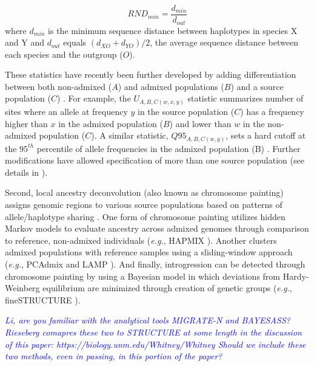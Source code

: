 \documentclass[11pt]{article}
\newcommand{\gmj}[1]{\textcolor{blue}{ \emph{\scriptsize  #1}} } %
\begin{document}
 
 \begin{equation}
 	RND_{min} = \frac{d_{min}}{d_{out}}
 \end{equation}
where $d_{min}$ is the minimum sequence distance between haplotypes in species X and Y and $d_{out}$ equals $(d_{XO} + d_{YO})/2$, the average sequence distance between each species and the outgroup ($O$).
 
These statistics have recently been further developed by adding differentiation between both non-admixed ($A$) and admixed populations ($B$) and a source population ($C$) \cite{racimo2016}. 
For example, the $U_{A,B,C(w,x,y)}$ statistic summarizes number of sites where an allele at frequency $y$ in the source population ($C$) has a frequency higher than $x$ in the admixed population ($B$) and lower than $w$ in the non-admixed population ($C$).
A similar statistic, $Q95_{A,B,C(w,y)}$, sets a hard cutoff at the $95^{th}$ percentile of allele frequencies in the admixed population (B) \cite{racimo2016}.
Further modifications have allowed specification of more than one source population (see details in \cite{racimo2016}).
 
Second, local ancestry deconvolution (also known as chromosome painting) assigns genomic regions to various source populations based on patterns of allele/haplotype sharing \cite{schraiber2015}. 
One form of chromosome painting utilizes hidden Markov models to evaluate ancestry across admixed genomes through comparison to reference, non-admixed individuals (\emph{e.g.}, HAPMIX \cite{Price2009}). 
Another clusters admixed populations with reference samples using a sliding-window approach (\emph{e.g.}, PCAdmix \cite{brisbin2012pcadmix} and LAMP \cite{sankararaman2008}).
And finally, introgression can be detected through chromosome painting by using a Bayesian model \cite{pritchard2000} in which deviations from Hardy-Weinberg equilibrium are minimized through creation of genetic groups (\emph{e.g.}, fineSTRUCTURE \cite{Lawson2012}). 

\gmj{Li, are you familiar with the analytical tools MIGRATE-N and BAYESASS?  Rieseberg comapres these two to STRUCTURE at some length in the discussion of this paper:
https://biology.unm.edu/Whitney/Whitney%
Should we include these two methods, even in passing, in this portion of the paper?}
\end{document}
